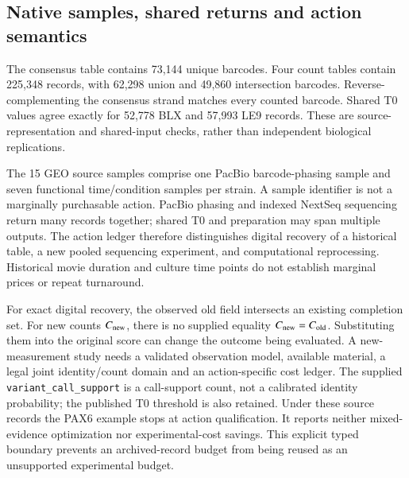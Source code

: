 \FloatBarrier
\subsection{Native samples, shared returns and action semantics}
The consensus table contains 73,144 unique barcodes. Four count tables contain 225,348 records, with 62,298 union and 49,860 intersection barcodes. Reverse-complementing the consensus strand matches every counted barcode. Shared T0 values agree exactly for 52,778 BLX and 57,993 LE9 records. These are source-representation and shared-input checks, rather than independent biological replications.

The 15 GEO source samples comprise one PacBio barcode-phasing sample and seven functional time/condition samples per strain. A sample identifier is not a marginally purchasable action. PacBio phasing and indexed NextSeq sequencing return many records together; shared T0 and preparation may span multiple outputs. The action ledger therefore distinguishes digital recovery of a historical table, a new pooled sequencing experiment, and computational reprocessing. Historical movie duration and culture time points do not establish marginal prices or repeat turnaround.

For exact digital recovery, the observed old field intersects an existing completion set. For new counts $C_{\rm new}$, there is no supplied equality $C_{\rm new}=C_{\rm old}$. Substituting them into the original score can change the outcome being evaluated. A new-measurement study needs a validated observation model, available material, a legal joint identity/count domain and an action-specific cost ledger. The supplied \nolinkurl{variant_call_support} is a call-support count, not a calibrated identity probability; the published T0 threshold is also retained. Under these source records the PAX6 example stops at action qualification. It reports neither mixed-evidence optimization nor experimental-cost savings. This explicit typed boundary prevents an archived-record budget from being reused as an unsupported experimental budget.
